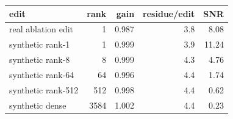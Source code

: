 \setlength{\tabcolsep}{4pt}
\begin{tabular}{@{}l r r r r@{}}
\toprule
edit & rank & gain & residue/edit & SNR \\
\midrule
real ablation edit & 1 & 0.987 & 3.8 & 8.08 \\
synthetic rank-1 & 1 & 0.999 & 3.9 & 11.24 \\
synthetic rank-8 & 8 & 0.999 & 4.3 & 4.76 \\
synthetic rank-64 & 64 & 0.996 & 4.4 & 1.74 \\
synthetic rank-512 & 512 & 0.998 & 4.4 & 0.62 \\
synthetic dense & 3584 & 1.002 & 4.4 & 0.23 \\
\bottomrule
\end{tabular}
